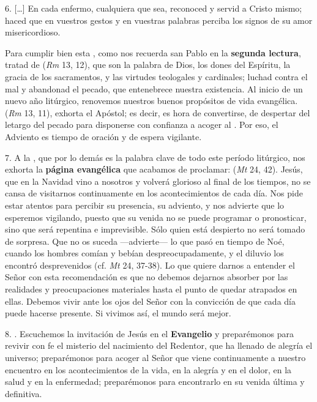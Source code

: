 6. [\ldots{}] En cada enfermo, cualquiera que sea, reconoced y servid a Cristo mismo; haced que en vuestros gestos y en vuestras palabras perciba los signos de su amor misericordioso.

Para cumplir bien esta , como nos recuerda san Pablo en la \textbf{segunda lectura}, tratad de  (\emph{Rm} 13, 12), que son la palabra de Dios, los dones del Espíritu, la gracia de los sacramentos, y las virtudes teologales y cardinales; luchad contra el mal y abandonad el pecado, que entenebrece nuestra existencia. Al inicio de un nuevo año litúrgico, renovemos nuestros buenos propósitos de vida evangélica.  (\emph{Rm} 13, 11), exhorta el Apóstol; es decir, es hora de convertirse, de despertar del letargo del pecado para disponerse con confianza a acoger al . Por eso, el Adviento es tiempo de oración y de espera vigilante.

7. A la , que por lo demás es la palabra clave de todo este período litúrgico, nos exhorta la \textbf{página evangélica} que acabamos de proclamar:  (\emph{Mt} 24, 42). Jesús, que en la Navidad vino a nosotros y volverá glorioso al final de los tiempos, no se cansa de visitarnos continuamente en los acontecimientos de cada día. Nos pide estar atentos para percibir su presencia, su adviento, y nos advierte que lo esperemos vigilando, puesto que su venida no se puede programar o pronosticar, sino que será repentina e imprevisible. Sólo quien está despierto no será tomado de sorpresa. Que no os suceda ---advierte--- lo que pasó en tiempo de Noé, cuando los hombres comían y bebían despreocupadamente, y el diluvio los encontró desprevenidos (cf. \emph{Mt} 24, 37-38). Lo que quiere darnos a entender el Señor con esta recomendación es que no debemos dejarnos absorber por las realidades y preocupaciones materiales hasta el punto de quedar atrapados en ellas. Debemos vivir ante los ojos del Señor con la convicción de que cada día puede hacerse presente. Si vivimos así, el mundo será mejor.

8. . Escuchemos la invitación de Jesús en el \textbf{Evangelio} y preparémonos para revivir con fe el misterio del nacimiento del Redentor, que ha llenado de alegría el universo; preparémonos para acoger al Señor que viene continuamente a nuestro encuentro en los acontecimientos de la vida, en la alegría y en el dolor, en la salud y en la enfermedad; preparémonos para encontrarlo en su venida última y definitiva.


